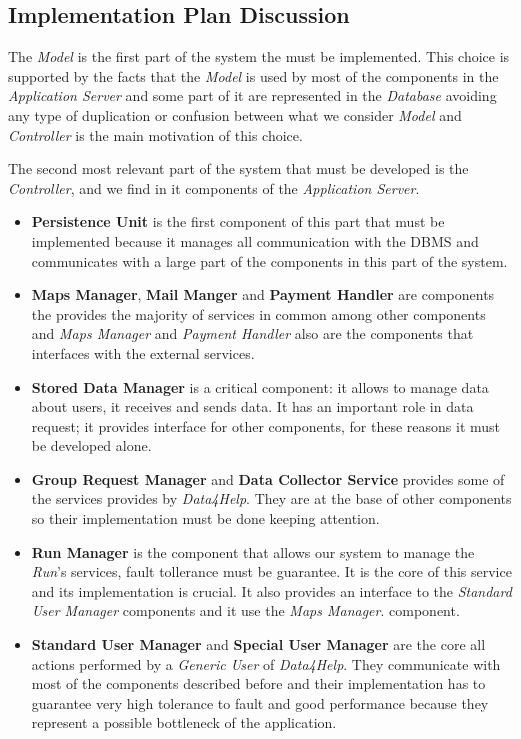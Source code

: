 \subsection{Implementation Plan Discussion}
\myparagraph{}
The \textit{Model} is the first part of the system the must be implemented. This choice is supported by the facts that the \textit{Model} is used by most of the components in the \textit{Application Server} and some part of it are represented in the \textit{Database} avoiding any type of duplication or confusion between what we consider \textit{Model} and \textit{Controller} is the main motivation of this choice.

\myparagraph{}
The second most relevant part of the system that must be developed is the \textit{Controller}, and we find in it components of the \textit{Application Server}.
\begin{itemize}
  \item \textbf{Persistence Unit} is the first component of this part that must be implemented because it manages all communication with the DBMS and communicates with a large part of the components in this part of the system.
  \item \textbf{Maps Manager}, \textbf{Mail Manger} and \textbf{Payment Handler} are components the provides the majority of services in common among other components and \textit{Maps Manager} and \textit{Payment Handler} also are the components that interfaces with the external services.
  \item \textbf{Stored Data Manager} is a critical component: it allows to manage data about users, it receives and sends data. It has an important role in data request; it provides interface for other components, for these reasons it must be developed alone.
  \item \textbf{Group Request Manager} and \textbf{Data Collector Service} provides some of the services provides by \textit{Data4Help}. They are at the base of other components so their implementation must be done keeping attention.
  \item \textbf{Run Manager} is the component that allows our system to manage the \textit{Run}'s services, fault tollerance must be guarantee. It is the core of this service and its implementation is crucial. It also provides an interface to the \textit{Standard User Manager} components and it use the \textit{Maps Manager}. component.
  \item \textbf{Standard User Manager} and \textbf{Special User Manager} are the core all actions performed by a \textit{Generic User} of \textit{Data4Help}. They communicate with most of the components described before and their implementation has to guarantee very high tolerance to fault and good performance because they represent a possible bottleneck of the application.

\end{itemize}
